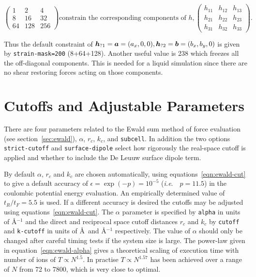 \documentclass[twoside]{report}
\newcommand{\ie}{{\em i.e}.\ }
\newcommand{\bm}[1]{\mbox{\boldmath \protect\(#1\protect\)}}
\begin{document}
\begin{displaymath}
\left (
\begin{array}{rrr}
1 & 2 & 4 \\ 8 & 16 & 32 \\ 64 & 128 & 256
\end{array}
\right )
\mbox{constrain the corresponding components of }
h, 
\left (
\begin{array}{rrr}
h_{11} & h_{12} & h_{13} \\ h_{21} & h_{22} & h_{23} \\ h_{31} & h_{32} & h_{33}
\end{array}
\right ).
\end{displaymath}

Thus the default constraint of $\bm{h}_{?1} = \bm{a} = (a_x,0,0),
\bm{h}_{?2} = \bm{b} = (b_x,b_y,0)$ is given by \texttt{strain-mask=200}
(8+64+128).  Another useful value is 238 which freezes all the
off-diagonal components.  This is needed for a liquid simulation since
there are no shear restoring forces acting on those components.

\section{Cutoffs and Adjustable Parameters}%

There are four parameters related to the Ewald sum method of force
evaluation (see section~\ref{sec:ewald}), $\alpha$, $r_c$, $k_c$, and
\texttt{subcell}.  In addition the two options \texttt{strict-cutoff}
and \texttt{surface-dipole} select how rigorously the real-space
cutoff is applied and whether to include the De Leuuw surface dipole
term.

By default $\alpha$, $r_c$ and $k_c$ are chosen automatically, using
equations~\ref{eqn:ewald-cut} to give a default accuracy of $\epsilon
= \exp(-p) = 10^{-5}$ (\ie\ $p = 11.5$) in the coulombic potential energy
evaluation.  An empirically determined value of $t_R/t_F = 5.5$ is
used.  If a different accuracy is desired the cutoffs may be adjusted
using equations~\ref{eqn:ewald-cut}.  The $\alpha$ parameter is
specified by \texttt{alpha} in units of \AA$^{-1}$ and the direct and
reciprocal space cutoff distances $r_{c}$ and $k_{c}$ by
\texttt{cutoff} and \texttt{k-cutoff} in units of \AA\ and \AA$^{-1}$
respectively.  The value of $\alpha$ should only be changed after
careful timing tests if the system size is large.  The power-law given
in equation~\ref{eqn:ewald-alpha} gives a theoretical scaling of
execution time with number of ions of $T \propto N^{1.5}$. In practise $T
\propto N^{1.57}$ has been achieved over a range of $N$ from 72 to
7800, which is very close to optimal.
\end{document}

